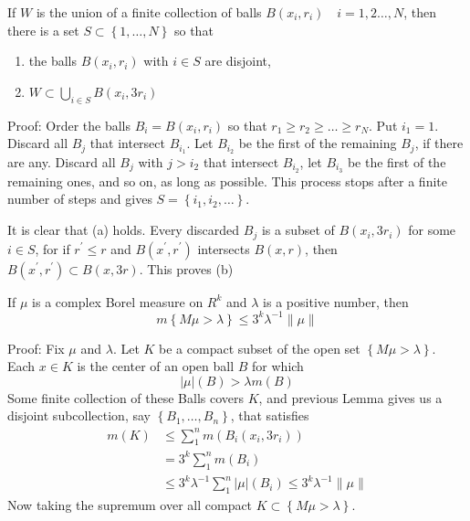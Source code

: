 \documentclass[12pt, a4paper, oneside]{book}
\begin{document}
\begin{lemma}
    If $W$ is the union of a finite collection of balls $B\left(x_i, r_i\right) \quad  i =1,2 \ldots , N$, then there is a set $S \subset\left\{1, \ldots, N\right\}$ so that
    \begin{enumerate}[label=(\roman*)]
        \item the balls $B\left(x_i, r_i\right)$ with $i \in S$ are disjoint,
        \item $W \subset \bigcup\limits_{i \in S} B\left(x_i, 3 r_i\right)$
    \end{enumerate}

    Proof:
    Order the balls $B_i=B\left(x_i, r_i\right)$ so that $r_1 \geq r_2 \geq \ldots \geq r_N$. Put $i_1=1$. Discard all $B_j$ that intersect $B_{i_1}$. Let $B_{i_2}$ be the first of the remaining $B_j$, if there are any. Discard all $B_j$ with $j>i_2$ that intersect $B_{i_2}$, let $B_{i_3}$ be the first of the remaining ones, and so on, as long as possible. This process stops after a finite number of steps and gives $S=\left\{i_1, i_2, \ldots\right\}$.

    It is clear that (a) holds. Every discarded $B_j$ is a subset of $B\left(x_i, 3 r_i\right)$ for some $i \in S$, for if $r^{\prime} \leq r$ and $B\left(x^{\prime}, r^{\prime}\right)$ intersects $B(x, r)$, then $B\left(x^{\prime}, r^{\prime}\right) \subset B(x, 3 r)$. This proves (b)
\end{lemma}

\newpage

\begin{theorem}
    If $\mu$ is a complex Borel measure on $R^k$ and $\lambda$ is a positive number, then
    \begin{equation*}
        m  \left\{M \mu> \lambda\right\}
        \leq
        3^k \lambda^{-1} \|\mu\|
    \end{equation*}

    Proof:
    Fix $\mu$ and $\lambda$. Let $K$ be a compact subset of the open set
    $\left\{M \mu>\lambda\right\}$. Each $x \in K$ is the center of an open ball $B$ for which
    \begin{equation*}
        \left|\mu\right|(B)
        >
        \lambda m(B)
    \end{equation*}
    Some finite collection of these Balls covers $K$, and previous Lemma gives us a disjoint subcollection, say $\left\{B_1, \ldots, B_n\right\}$, that satisfies
    \begin{equation*}
        \begin{aligned}
            m(K) & \leq \sum_1^n m\left(B_i(x_i,3 r_i)\right)                                       \\
                 & = 3^k \sum_1^n m\left(B_i\right)                                                 \\
                 & \leq 3^k \lambda^{-1} \sum_1^n|\mu|\left(B_i\right) \leq 3^k \lambda^{-1}\|\mu\|
        \end{aligned}
    \end{equation*}
    Now taking the supremum over all compact $K \subset\left\{M \mu>\lambda\right\}$.
\end{theorem}
\end{document}
